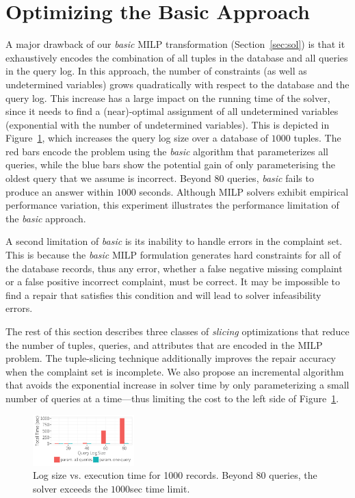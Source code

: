 
\section{Optimizing the Basic Approach}
\label{sec:opt}

A major drawback of our \emph{basic} MILP transformation (Section~\ref{sec:sol}) is
that it exhaustively encodes the combination of all tuples in the database and all queries
in the query log.  In this approach, the number of constraints (as well as undetermined variables) 
grows quadratically with respect to the database and the query log.
This increase has a large impact on the running time of the solver, since it needs to find a (near)-optimal 
assignment of all undetermined variables (exponential with the number of undetermined variables).
This is depicted in Figure~\ref{fig:querysize_vs_time}, which increases the query log size over a database of $1000$ tuples.  
The red bars encode the problem using  the \emph{basic} algorithm that parameterizes all queries, while the blue bars show the potential gain of only parameterising the oldest query that we assume is incorrect.
Beyond $80$ queries, \emph{basic} fails to produce an answer within $1000$ seconds.
Although MILP solvers exhibit empirical performance variation,
this experiment illustrates the performance limitation of the \emph{basic} approach. 

A second limitation of \emph{basic} is its inability to handle errors in the complaint set.
This is because the \emph{basic} MILP formulation generates hard constraints for all of the database records, thus any error, whether a false negative missing complaint or a false positive incorrect complaint, must be correct.
It may be impossible to find a repair that satisfies this condition and will lead to solver infeasibility errors.


The rest of this section describes three classes of \emph{slicing} optimizations that 
reduce the number of tuples, queries, and attributes that are encoded in the MILP problem. 
The tuple-slicing technique additionally improves the repair accuracy when the complaint set is incomplete. 
We also propose an incremental algorithm that avoids the exponential increase in solver time by only parameterizing a small number of queries at a time---thus limiting
the cost to the left side of Figure~\ref{fig:querysize_vs_time}.







\begin{figure}[t]
    \centering
    \includegraphics[width=0.35\textwidth]{figures/qsize_time_badscale}
    \vspace*{-0.1in}
    \caption{Log size vs. execution time for 1000 records. Beyond $80$ queries, the solver exceeds the $1000$sec time limit.}
    \label{fig:querysize_vs_time}
\end{figure}

